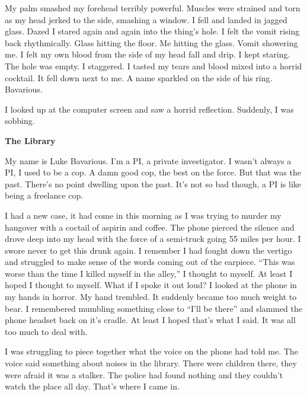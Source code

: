My palm smashed my forehead terribly powerful. Muscles were
strained and torn as my head jerked to the side, smashing a window.
I fell and landed in jagged glass. Dazed I stared again and again
into the thing's hole. I felt the vomit rising back rhythmically.
Glass hitting the floor. Me hitting the glass. Vomit showering me.
I felt my own blood from the side of my head fall and drip. I kept
staring. The hole was empty. I staggered. I tasted my tears and
blood mixed into a horrid cocktail. It fell down next to me. A name
sparkled on the side of his ring. Bavarious.

I looked up at the computer screen and saw a horrid reflection.
Suddenly, I was sobbing. 
 





{\bf The Library}



My name is Luke Bavarious. I'm a PI, a private investigator. I
wasn't always a PI, I used to be a cop. A damn good cop, the best
on the force. But that was the past. There's no point dwelling upon
the past. It's not so bad though, a PI is like being a freelance
cop.



I had a new case, it had come in this morning as I was trying to
murder my hangover with a coctail of aspirin and coffee. The phone
pierced the silence and drove deep into my head with the force of a
semi-truck going 55 miles per hour. I swore never to get this drunk
again. I remember I had fought down the vertigo and struggled to
make sense of the words coming out of the earpiece. ``This was worse
than the time I killed myself in the alley,'' I thought to myself.
At least I hoped I thought to myself. What if I spoke it out loud?
I looked at the phone in my hands in horror. My hand trembled. It
suddenly became too much weight to bear. I remembered mumbling
something close to ``I'll be there'' and slammed the phone headset
back on it's cradle. At least I hoped that's what I said. It was
all too much to deal with.



I was struggling to piece together what the voice on the phone had
told me. The voice said something about noises in the library.
There were children there, they were afraid it was a stalker. The
police had found nothing and they couldn't watch the place all day.
That's where I came in.



